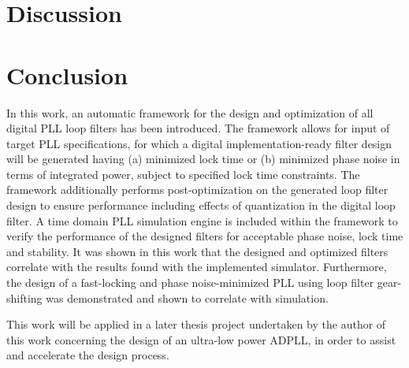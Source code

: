 	\FloatBarrier\pagebreak

	\section{Discussion}\label{disco}
    

    \FloatBarrier

    \pagebreak
    \section{Conclusion} \label{conclusion}
    In this work, an automatic framework for the design and optimization of all digital PLL loop filters has been introduced. The framework allows for input of target PLL specifications, for which a digital implementation-ready filter design will be generated having (a) minimized lock time or (b) minimized phase noise in terms of integrated power, subject to specified lock time constraints. The framework additionally performs post-optimization on the generated loop filter design to ensure performance including effects of quantization in the digital loop filter. A time domain PLL simulation engine is included within the framework to verify the performance of the designed filters for acceptable phase noise, lock time and stability. It was shown in this work that the designed and optimized filters correlate with the results found with the implemented simulator. Furthermore, the design of a fast-locking and phase noise-minimized PLL using loop filter gear-shifting was demonstrated and shown to correlate with simulation.

    This work will be applied in a later thesis project undertaken by the author of this work concerning the design of an ultra-low power ADPLL, in order to assist and accelerate the design process. 

    \pagebreak
	\printbibliography


	\pagebreak
	


